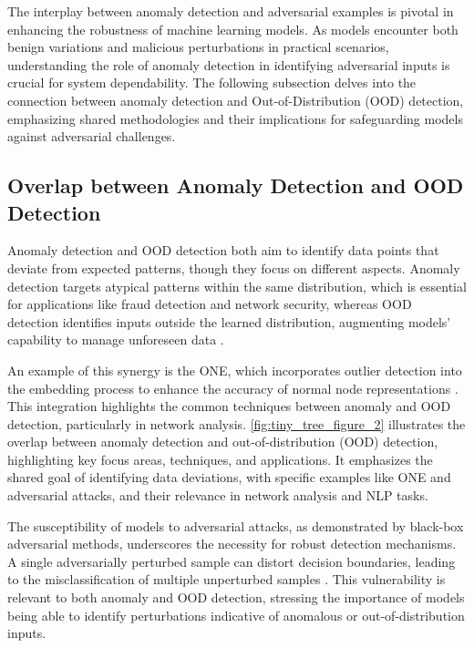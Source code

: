The interplay between anomaly detection and adversarial examples is pivotal in enhancing the robustness of machine learning models. As models encounter both benign variations and malicious perturbations in practical scenarios, understanding the role of anomaly detection in identifying adversarial inputs is crucial for system dependability. The following subsection delves into the connection between anomaly detection and Out-of-Distribution (OOD) detection, emphasizing shared methodologies and their implications for safeguarding models against adversarial challenges.


\subsection{Overlap between Anomaly Detection and OOD Detection} \label{subsec:Overlap between Anomaly Detection and OOD Detection}

Anomaly detection and OOD detection both aim to identify data points that deviate from expected patterns, though they focus on different aspects. Anomaly detection targets atypical patterns within the same distribution, which is essential for applications like fraud detection and network security, whereas OOD detection identifies inputs outside the learned distribution, augmenting models' capability to manage unforeseen data \cite{lang2023survey}.

An example of this synergy is the ONE, which incorporates outlier detection into the embedding process to enhance the accuracy of normal node representations \cite{bandyopadhyay2018outlierawarenetworkembedding}. This integration highlights the common techniques between anomaly and OOD detection, particularly in network analysis. \autoref{fig:tiny_tree_figure_2} illustrates the overlap between anomaly detection and out-of-distribution (OOD) detection, highlighting key focus areas, techniques, and applications. It emphasizes the shared goal of identifying data deviations, with specific examples like ONE and adversarial attacks, and their relevance in network analysis and NLP tasks.

The susceptibility of models to adversarial attacks, as demonstrated by black-box adversarial methods, underscores the necessity for robust detection mechanisms. A single adversarially perturbed sample can distort decision boundaries, leading to the misclassification of multiple unperturbed samples \cite{chhabra2019suspicionfreeadversarialattacksclustering}. This vulnerability is relevant to both anomaly and OOD detection, stressing the importance of models being able to identify perturbations indicative of anomalous or out-of-distribution inputs.


